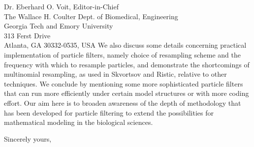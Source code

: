 \documentclass{letter} %
\begin{document}
\begin{letter}{Dr. Eberhard O. Voit, Editor-in-Chief \\
The Wallace H. Coulter Dept. of Biomedical, Engineering \\
Georgia Tech and Emory University \\
313 Ferst Drive \\
Atlanta, GA 30332-0535, USA
}
We also discuss some details concerning practical implementation of particle filters, namely choice of resampling scheme and the frequency with which to resample particles, and demonstrate the shortcomings of multinomial resampling, as used in Skvortsov and Ristic, relative to other techniques. We conclude by mentioning some more sophisticated particle filters that can run more efficiently under certain model structures or with more coding effort. Our aim here is to broaden awareness of the depth of methodology that has been developed for particle filtering to extend the possibilities for mathematical modeling in the biological sciences.

\closing{Sincerely yours,}

\end{letter}
\end{document}
